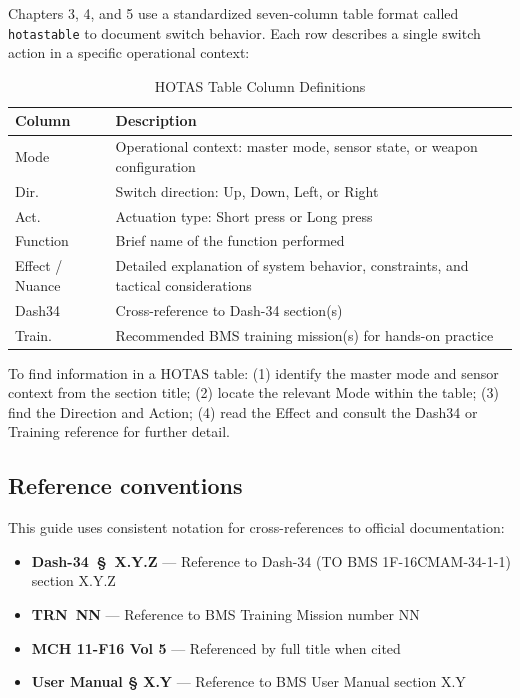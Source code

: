 \documentclass[11pt, a4paper, twoside]{report}
\providecommand{\dashref}[1]{Dash-34~\S~#1}
\providecommand{\trnref}[1]{TRN~#1}
\begin{document}
Chapters 3, 4, and 5 use a standardized seven-column table format called \texttt{hotastable} to document switch behavior. Each row describes a single switch action in a specific operational context:

\begin{table}[H]
\centering
\caption{HOTAS Table Column Definitions}
\label{tab:C1-hotastable-format}
\small
\renewcommand{\arraystretch}{1.25}
\begin{tabular}{L{2.2cm} L{11.5cm}}
\toprule
\textbf{Column} & \textbf{Description} \\
\midrule
Mode & Operational context: master mode, sensor state, or weapon configuration \\
Dir. & Switch direction: Up, Down, Left, or Right \\
Act. & Actuation type: Short press or Long press \\
Function & Brief name of the function performed \\
Effect / Nuance & Detailed explanation of system behavior, constraints, and tactical considerations \\
Dash34 & Cross-reference to Dash-34 section(s) \\
Train. & Recommended BMS training mission(s) for hands-on practice \\
\bottomrule
\end{tabular}
\end{table}

To find information in a HOTAS table: (1) identify the master mode and sensor context from the section title; (2) locate the relevant Mode within the table; (3) find the Direction and Action; (4) read the Effect and consult the Dash34 or Training reference for further detail.

\subsection{Reference conventions}
\label{sec:C1-S3-S3}

This guide uses consistent notation for cross-references to official documentation:

\begin{itemize}
  \item \textbf{\dashref{X.Y.Z}} --- Reference to Dash-34 (TO BMS 1F-16CMAM-34-1-1) section X.Y.Z
  \item \textbf{\trnref{NN}} --- Reference to BMS Training Mission number NN
  \item \textbf{MCH 11-F16 Vol 5} --- Referenced by full title when cited
  \item \textbf{User Manual § X.Y} --- Reference to BMS User Manual section X.Y
\end{itemize}
\end{document}
